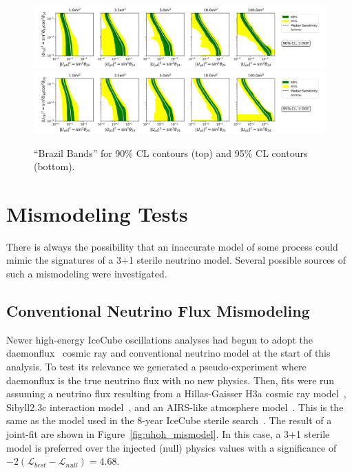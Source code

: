 \documentclass[main.tex]{subfiles}
\begin{document}
\begin{figure}
    \centering
    \includegraphics[width=0.95\linewidth]{figures/median_sense_cl0.9.png}\\
    \includegraphics[width=0.95\linewidth]{figures/median_sense_cl0.95.png}
    \caption{``Brazil Bands'' for 90\% CL contours (top) and 95\% CL contours (bottom).}\label{fig:brazil}
\end{figure}

\section{Mismodeling Tests}

There is always the possibility that an inaccurate model of some process could mimic the signatures of a 3+1 sterile neutrino model. 
Several possible sources of such a mismodeling were investigated. 

\subsection{Conventional Neutrino Flux Mismodeling}

Newer high-energy IceCube oscillations analyses had begun to adopt the daemonflux~\cite{yanez2023daemonflux} cosmic ray and conventional neutrino model at the start of this analysis. 
To test its relevance we generated a pseudo-experiment where daemonflux is the true neutrino flux with no new physics. 
Then, fits were run assuming a neutrino flux resulting from a Hillas-Gaisser H3a cosmic ray model~\cite{GAISSER2012801}, Sibyll2.3c interaction model~\cite{Riehn:2017mfm}, and an AIRS-like atmosphere model~\cite{airs_ref}. 
This is the same as the model used in the 8-year IceCube sterile search~\cite{Aartsen_2020, Aartsen_2020_prd}. 
The result of a joint-fit are shown in Figure~\ref{fig:uhoh_mismodel}.
In this case, a 3+1 sterile model is preferred over the injected (null) physics values with a significance of $-2(\mathcal{L}_{best}-\mathcal{L}_{null})=4.68$. 
\end{document}
